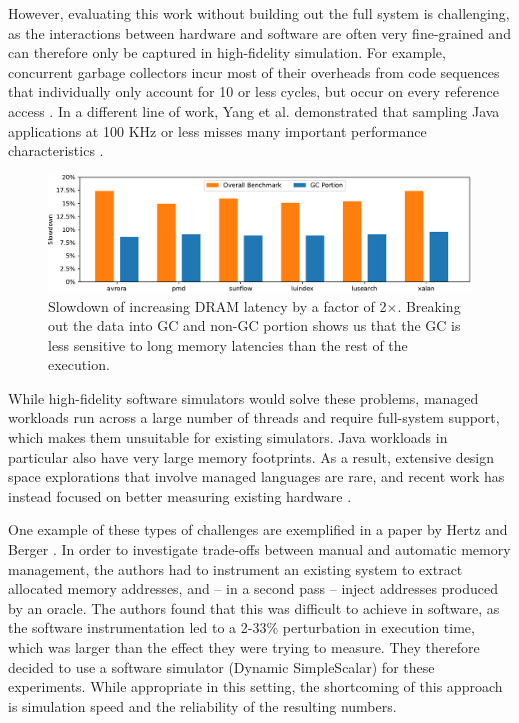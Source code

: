 However, evaluating this work without building out the full system is challenging, as the interactions between hardware and software are often very fine-grained and can therefore only be captured in high-fidelity simulation. For example, concurrent garbage collectors incur most of their overheads from code sequences that individually only account for 10 or less cycles, but occur on every reference access \cite{Click:2005:PGA:1064979.1064988}. In a different line of work, Yang et al. demonstrated that sampling Java applications at 100 KHz or less misses many important performance characteristics \cite{Yang:2015:CPM:2749469.2750401}.


\begin{figure}[t]
		\centering
		\includegraphics[width=\columnwidth]{results/dacapo-varymodel.pdf}
		\caption{Slowdown of increasing DRAM latency by a factor of 2$\times$. Breaking out the data into GC and non-GC portion shows us that the GC is less sensitive to long memory latencies than the rest of the execution.}
		\label{fig:dacapo_latency2x}
\end{figure}

While high-fidelity software simulators would solve these problems, managed workloads run across a large number of threads and require full-system support, which makes them unsuitable for existing simulators. Java workloads in particular also have very large memory footprints. As a result, extensive design space explorations that involve managed languages are rare, and recent work has instead focused on better measuring existing hardware \cite{Cao:2012:YYP:2337159.2337185,Yang:2015:CPM:2749469.2750401}.

One example of these types of challenges are exemplified in a paper by Hertz and Berger \cite{Hertz:2005:QPG:1094811.1094836}. In order to investigate trade-offs between manual and automatic memory management, the authors had to instrument an existing system to extract allocated memory addresses, and -- in a second pass -- inject addresses produced by an oracle. The authors found that this was difficult to achieve in software, as the software instrumentation led to a 2-33\% perturbation in execution time, which was larger than the effect they were trying to measure. They therefore decided to use a software simulator (Dynamic SimpleScalar) for these experiments. While appropriate in this setting, the shortcoming of this approach is simulation speed and the reliability of the resulting numbers.

